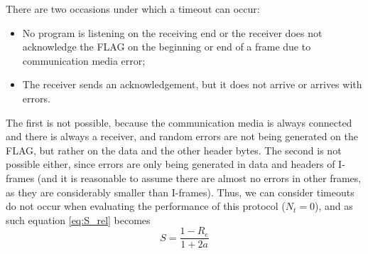 \documentclass[a4paper, 11pt]{report}
\begin{document}
There are two occasions under which a timeout can occur:
\begin{itemize}
	\itemsep0em
	\item No program is listening on the receiving end or the receiver does not acknowledge the FLAG on the beginning or end of a frame due to communication media error; 
	\item The receiver sends an acknowledgement, but it does not arrive or arrives with errors.
\end{itemize}
The first is not possible, because the communication media is always connected and there is always a receiver, and random errors are not being generated on the FLAG, but rather on the data and the other header bytes. The second is not possible either, since errors are only being generated in data and headers of I-frames (and it is reasonable to assume there are almost no errors in other frames, as they are considerably smaller than I-frames). Thus, we can consider timeouts do not occur when evaluating the performance of this protocol ($N_t=0$), and as such equation \ref{eq:S_rel} becomes
\begin{equation} \label{eq:Sfinal}
	S = \frac{1-R_e}{1 + 2a}
\end{equation}
\end{document}
